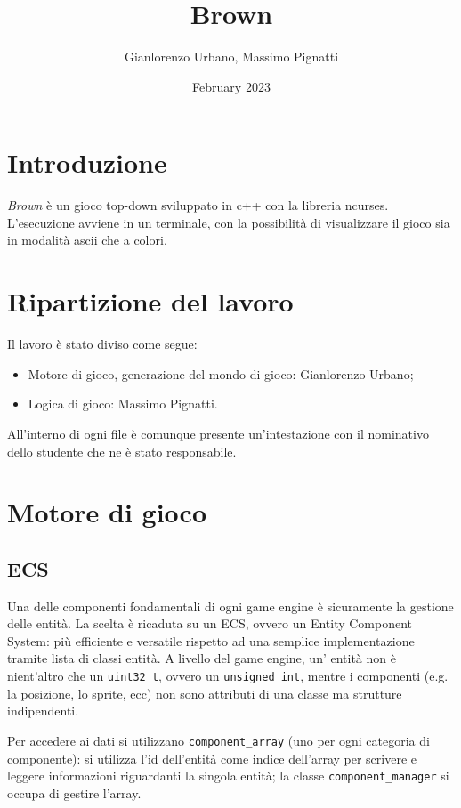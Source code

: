 \documentclass{article}
\title{Brown}
\author{Gianlorenzo Urbano, Massimo Pignatti}
\date{February 2023}
\begin{document}
\maketitle

\section{Introduzione}

\emph{Brown} è un gioco top-down sviluppato in c++ con la libreria ncurses. L'esecuzione avviene in un terminale, con la possibilità di visualizzare il gioco sia in modalità ascii che a colori.

\section{Ripartizione del lavoro}
Il lavoro è stato diviso come segue:
\begin{itemize}
    \item Motore di gioco, generazione del mondo di gioco: Gianlorenzo Urbano;
    \item Logica di gioco: Massimo Pignatti.
\end{itemize}
All'interno di ogni file è comunque presente un'intestazione con il nominativo dello studente che ne è stato responsabile.

\section{Motore di gioco}

\subsection{ECS}
Una delle componenti fondamentali di ogni game engine è sicuramente la gestione delle entità.
La scelta è ricaduta su un ECS, ovvero un Entity Component System: più efficiente e versatile rispetto ad una semplice implementazione tramite lista di classi entità.
A livello del game engine, un' entità non è nient'altro che un \verb|uint32_t|, ovvero un \verb|unsigned int|, mentre i componenti (e.g. la posizione, lo sprite, ecc) non sono attributi di una classe ma strutture indipendenti.

Per accedere ai dati si utilizzano \verb|component_array| (uno per ogni categoria di componente): si utilizza l'id dell'entità come indice dell'array per scrivere e leggere informazioni riguardanti la singola entità; la classe \verb!component_manager! si occupa di gestire l'array.
\end{document}
